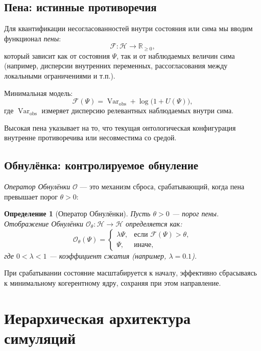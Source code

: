 \documentclass[11pt,a4paper]{article}
\newtheorem{definition}{Определение}
\begin{document}
\subsection{Пена: истинные противоречия}
Для квантификации несогласованностей внутри состояния или сима
мы вводим функционал \emph{пены}:
\begin{equation}
  \mathcal{F}: \mathcal{H} \to \mathbb{R}_{\ge 0},
\end{equation}
который зависит как от состояния $\Psi$,
так и от наблюдаемых величин сима
(например, дисперсии внутренних переменных,
рассогласования между локальными ограничениями и т.п.).

Минимальная модель:
\begin{equation}
  \mathcal{F}(\Psi)
  = \operatorname{Var}_{\text{obs}} + \log\bigl(1 + U(\Psi)\bigr),
  \label{eq:foam}
\end{equation}
где $\operatorname{Var}_{\text{obs}}$ измеряет дисперсию
релевантных наблюдаемых внутри сима.

Высокая пена указывает на то,
что текущая онтологическая конфигурация
внутренне противоречива или несовместима со средой.

\subsection{Обнулёнка: контролируемое обнуление}
\emph{Оператор Обнулёнки} $\mathcal{O}$ --- это механизм сброса,
срабатывающий, когда пена превышает порог $\theta > 0$:
\begin{definition}[Оператор Обнулёнки]
Пусть $\theta > 0$ --- порог пены.
Отображение Обнулёнки $\mathcal{O}_\theta: \mathcal{H} \to \mathcal{H}$
определяется как:
\[
  \mathcal{O}_\theta(\Psi) =
  \begin{cases}
    \lambda \Psi, & \text{если } \mathcal{F}(\Psi) > \theta, \\
    \Psi,        & \text{иначе},
  \end{cases}
\]
где $0 < \lambda < 1$ --- коэффициент сжатия
(например, $\lambda = 0.1$).
\end{definition}
При срабатывании состояние масштабируется к началу,
эффективно сбрасываясь к минимальному когерентному ядру,
сохраняя при этом направление.

\section{Иерархическая архитектура симуляций}
\end{document}
